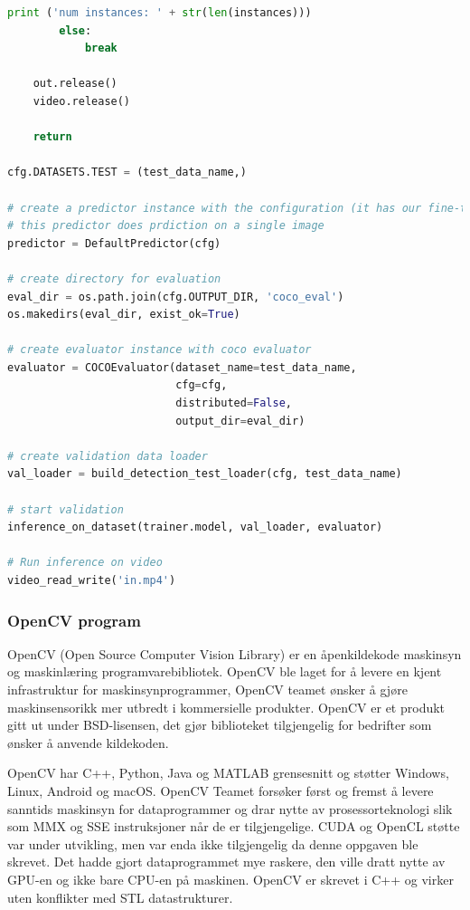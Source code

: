 \begin{lstlisting}[language=Python, caption=Inferens RetinaNet i inference.py]
            print ('num instances: ' + str(len(instances)))
        else:
            break
    
    out.release()
    video.release()
    
    return

cfg.DATASETS.TEST = (test_data_name,)

# create a predictor instance with the configuration (it has our fine-tuned model)
# this predictor does prdiction on a single image
predictor = DefaultPredictor(cfg)

# create directory for evaluation
eval_dir = os.path.join(cfg.OUTPUT_DIR, 'coco_eval')
os.makedirs(eval_dir, exist_ok=True)

# create evaluator instance with coco evaluator
evaluator = COCOEvaluator(dataset_name=test_data_name,
                          cfg=cfg,
                          distributed=False,
                          output_dir=eval_dir)

# create validation data loader
val_loader = build_detection_test_loader(cfg, test_data_name)

# start validation 
inference_on_dataset(trainer.model, val_loader, evaluator)

# Run inference on video
video_read_write('in.mp4')
\end{lstlisting}

\subsubsection{OpenCV program} \label{part:opencv}

OpenCV (Open Source Computer Vision Library) er en åpenkildekode maskinsyn og maskinlæring programvarebibliotek. OpenCV ble laget for å levere en kjent infrastruktur for maskinsynprogrammer, OpenCV teamet ønsker å gjøre maskinsensorikk mer utbredt i kommersielle produkter. OpenCV er et produkt gitt ut under BSD-lisensen, det gjør biblioteket tilgjengelig for bedrifter som ønsker å anvende kildekoden. \cite{OpenCV Team 2020}

OpenCV har C++, Python, Java og MATLAB grensesnitt og støtter Windows, Linux, Android og macOS. OpenCV Teamet forsøker først og fremst å levere sanntids maskinsyn for dataprogrammer og drar nytte av prosessorteknologi slik som MMX og SSE instruksjoner når de er tilgjengelige. CUDA og OpenCL støtte var under utvikling, men var enda ikke tilgjengelig da denne oppgaven ble skrevet. Det hadde gjort dataprogrammet mye raskere, den ville dratt nytte av GPU-en og ikke bare CPU-en på maskinen. OpenCV er skrevet i C++ og virker uten konflikter med STL datastrukturer. \cite{OpenCV Team 2020}

